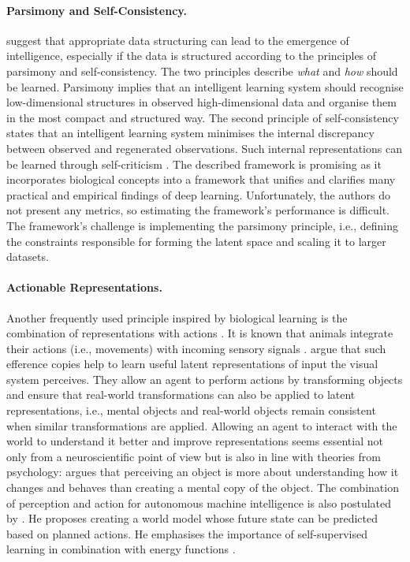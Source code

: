 \paragraph{Parsimony and Self-Consistency.}  suggest that appropriate data structuring can lead to the emergence of intelligence, especially if the data is structured according to the principles of parsimony and self-consistency. The two principles describe \emph{what} and \emph{how} should be learned. Parsimony implies that an intelligent learning system should recognise low-dimensional structures in observed high-dimensional data and organise them in the most compact and structured way. The second principle of self-consistency states that an intelligent learning system minimises the internal discrepancy between observed and regenerated observations. Such internal representations can be learned through self-criticism . The described framework is promising as it incorporates biological concepts into a framework that unifies and clarifies many practical and empirical findings of deep learning.
Unfortunately, the authors do not present any metrics, so estimating the framework's performance is difficult.
The framework's challenge is implementing the parsimony principle, i.e., defining the constraints responsible for forming the latent space and scaling it to larger datasets.

\paragraph{Actionable Representations.} Another frequently used principle inspired by biological learning is the combination of representations with actions . It is known that animals integrate their actions (i.e., movements) with incoming sensory signals .
 argue that such efference copies help to learn useful latent representations of input the visual system perceives. They allow an agent to perform actions by transforming objects and ensure that real-world transformations can also be applied to latent representations, i.e., mental objects and real-world objects remain consistent when similar transformations are applied.
Allowing an agent to interact with the world to understand it better and improve representations seems essential not only from a neuroscientific point of view but is also in line with theories from psychology:
 argues that perceiving an object is more about understanding how it changes and behaves than creating a mental copy of the object.
The combination of perception and action for autonomous machine intelligence is also postulated by . He proposes creating a world model whose future state can be predicted based on planned actions. He emphasises the importance of self-supervised learning in combination with energy functions .

